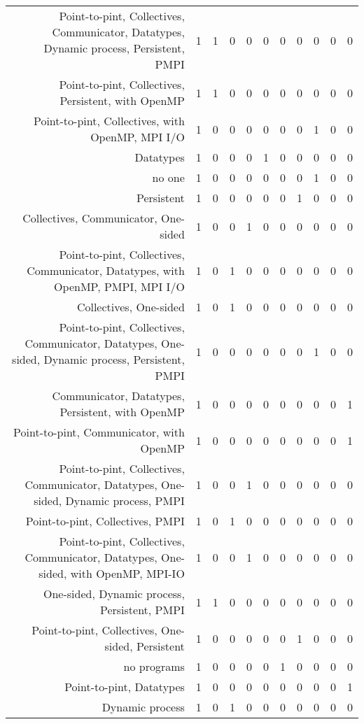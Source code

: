 {\begin{landscape}
\begin{longtable}[htb]{r|c|c|c|c|c|c|c|c|c|c}
{Point-to-pint, Collectives, Communicator, Datatypes, Dynamic process, Persistent, PMPI} & 1 & 1 & 0 & 0 & 0 & 0 & 0 & 0 & 0 & 0 \\%
{Point-to-pint, Collectives, Persistent, with OpenMP} & 1 & 1 & 0 & 0 & 0 & 0 & 0 & 0 & 0 & 0 \\%
{Point-to-pint, Collectives, with OpenMP, MPI I/O} & 1 & 0 & 0 & 0 & 0 & 0 & 0 & 1 & 0 & 0 \\%
{Datatypes} & 1 & 0 & 0 & 0 & 1 & 0 & 0 & 0 & 0 & 0 \\%
{no one} & 1 & 0 & 0 & 0 & 0 & 0 & 0 & 1 & 0 & 0 \\%
{Persistent} & 1 & 0 & 0 & 0 & 0 & 0 & 1 & 0 & 0 & 0 \\%
{Collectives, Communicator, One-sided} & 1 & 0 & 0 & 1 & 0 & 0 & 0 & 0 & 0 & 0 \\%
{Point-to-pint, Collectives, Communicator, Datatypes, with OpenMP, PMPI, MPI I/O} & 1 & 0 & 1 & 0 & 0 & 0 & 0 & 0 & 0 & 0 \\%
{Collectives, One-sided} & 1 & 0 & 1 & 0 & 0 & 0 & 0 & 0 & 0 & 0 \\%
{Point-to-pint, Collectives, Communicator, Datatypes, One-sided, Dynamic process, Persistent, PMPI} & 1 & 0 & 0 & 0 & 0 & 0 & 0 & 1 & 0 & 0 \\%
{Communicator, Datatypes, Persistent, with OpenMP} & 1 & 0 & 0 & 0 & 0 & 0 & 0 & 0 & 0 & 1 \\%
{Point-to-pint, Communicator, with OpenMP} & 1 & 0 & 0 & 0 & 0 & 0 & 0 & 0 & 0 & 1 \\%
{Point-to-pint, Collectives, Communicator, Datatypes, One-sided, Dynamic process, PMPI} & 1 & 0 & 0 & 1 & 0 & 0 & 0 & 0 & 0 & 0 \\%
{Point-to-pint, Collectives, PMPI} & 1 & 0 & 1 & 0 & 0 & 0 & 0 & 0 & 0 & 0 \\%
{Point-to-pint, Collectives, Communicator, Datatypes, One-sided, with OpenMP, MPI-IO} & 1 & 0 & 0 & 1 & 0 & 0 & 0 & 0 & 0 & 0 \\%
{One-sided, Dynamic process, Persistent, PMPI} & 1 & 1 & 0 & 0 & 0 & 0 & 0 & 0 & 0 & 0 \\%
{Point-to-pint, Collectives, One-sided, Persistent} & 1 & 0 & 0 & 0 & 0 & 0 & 1 & 0 & 0 & 0 \\%
{no programs} & 1 & 0 & 0 & 0 & 0 & 1 & 0 & 0 & 0 & 0 \\%
{Point-to-pint, Datatypes} & 1 & 0 & 0 & 0 & 0 & 0 & 0 & 0 & 0 & 1 \\%
{Dynamic process} & 1 & 0 & 1 & 0 & 0 & 0 & 0 & 0 & 0 & 0 \\%

\end{longtable}
\end{landscape}}
